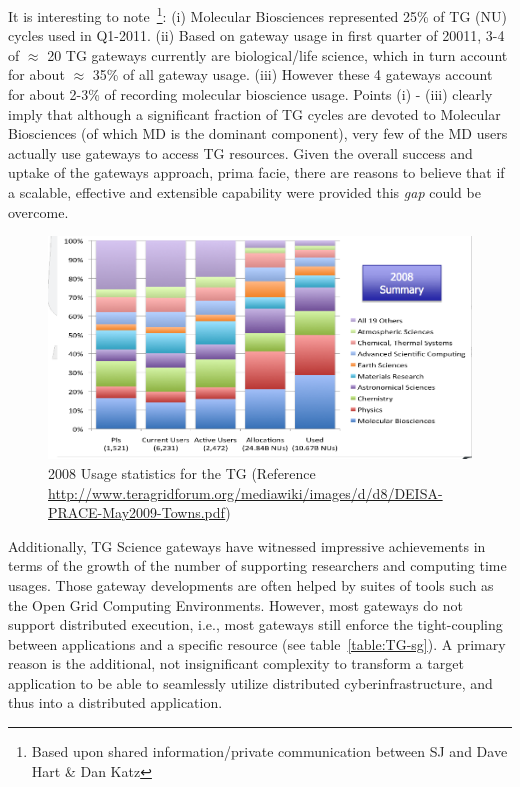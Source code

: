 \documentclass{sig-alternate}
\begin{document}

It is interesting to note~\footnote{Based upon shared
  information/private communication between SJ and Dave Hart \& Dan
  Katz}: (i) Molecular Biosciences represented 25\% of TG (NU) cycles
used in Q1-2011.  (ii) Based on gateway usage in first quarter of
20011, 3-4 of $\approx$ 20 TG gateways currently are biological/life
science, which in turn account for about $\approx$ 35\% of all gateway
usage. (iii) However these 4 gateways account for about 2-3\% of
recording molecular bioscience usage. Points (i) - (iii) clearly imply
that although a significant fraction of TG cycles are devoted to
Molecular Biosciences (of which MD is the dominant component), very
few of the MD users actually use gateways to access TG resources.
Given the overall success and uptake of the gateways approach, prima
facie, there are reasons to believe that if a scalable, effective and
extensible capability were provided this {\it gap} could be overcome.
 
\begin{figure}
 \centering
\includegraphics[scale=0.27]{figures/teragrid-discipline08}
\caption{\small 2008 Usage statistics for the TG (Reference
  \url{http://www.teragridforum.org/mediawiki/images/d/d8/DEISA-PRACE-May2009-Towns.pdf})}
  \label{tg2008}
\end{figure}

Additionally, TG Science gateways have witnessed impressive
achievements in terms of the growth of the number of supporting
researchers and computing time usages.  Those gateway developments are
often helped by suites of tools such as the Open Grid Computing
Environments\cite{ogce-2010}.  However, most gateways do not support
distributed execution, i.e., most gateways still enforce the
tight-coupling between applications and a specific resource (see
table~\ref{table:TG-sg}).  A primary reason is the additional, not
insignificant complexity to transform a target application to be able
to seamlessly utilize distributed cyberinfrastructure, and thus into a
distributed application.
\end{document}
